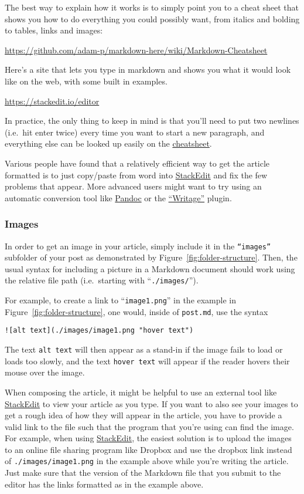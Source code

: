 \documentclass[paper=a4, fontsize=11pt]{scrartcl}
\numberwithin{equation}{section}        %
\numberwithin{figure}{section}            %
\numberwithin{table}{section}                %
\begin{document}
The best way to explain how it works is to simply point you to a cheat
sheet that shows you how to do everything you could possibly want,
from italics and bolding to tables, links and images:

\url{https://github.com/adam-p/markdown-here/wiki/Markdown-Cheatsheet}

Here's a site that lets you type in markdown and shows you what it would
look like on the web, with some built in examples.

\url{https://stackedit.io/editor}

In practice, the only thing to keep in mind is that you'll need to put
two newlines (i.e.\ hit enter twice) every time you want to start a new
paragraph, and everything else can be looked up easily on the
\href{https://github.com/adam-p/markdown-here/wiki/Markdown-Cheatsheet}{cheatsheet}.

Various people have found
that a relatively efficient way to get the article formatted is to just copy/paste
from word into \href{https://stackedit.io/editor}{StackEdit} and fix the few problems that appear. More advanced users
might want to try using an automatic conversion tool like
\href{http://pandoc.org/demos.html}{Pandoc} or the
\href{http://www.writage.com/}{``Writage''} plugin.

\subsubsection{Images}\label{sec:image-links}
In order to get an image in your article, simply include it in the
\texttt{``images''} subfolder of your post as demonstrated by
Figure~\ref{fig:folder-structure}. Then, the usual syntax for including a
picture in a Markdown document should work using the relative file path
(i.e.\ starting with ``\texttt{./images/}'').

For example, to create a link to ``\texttt{image1.png}'' in the example in
Figure~\ref{fig:folder-structure}, one would, inside of \texttt{post.md}, use
the syntax

\begin{verbatim}![alt text](./images/image1.png "hover text")\end{verbatim}

The text \texttt{alt text} will then appear as a stand-in if the image fails to
load or loads too slowly, and the text \texttt{hover text} will appear if the
reader hovers their mouse over the image.

When composing the article, it might be helpful to use an external tool like
\href{https://stackedit.io/editor}{StackEdit} to view your article as you type.
If you want to also see your images to get a rough idea of how they will appear
in the article, you have to provide a valid link to the file such that the
program that you're using can find the image. For example, when using
\href{https://stackedit.io/editor}{StackEdit}, the easiest solution is to upload
the images to an online file sharing program like Dropbox and use the dropbox
link instead of \texttt{./images/image1.png} in the example above while you're
writing the article. Just make sure that the version of the Markdown file that you
submit to the editor has the links formatted as in the example above.
\end{document}
